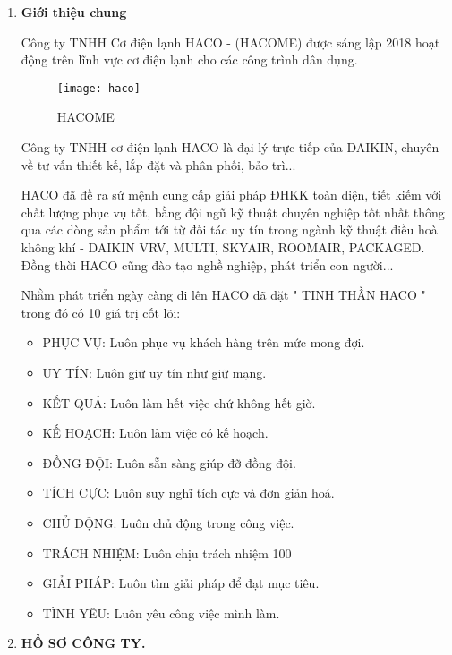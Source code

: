 \documentclass[12pt,a4paper]{article}
\begin{document}
\begin{enumerate}
   \item \textbf{Giới thiệu chung}
   
\hspace{1cm} Công ty TNHH Cơ điện lạnh HACO - (HACOME) được sáng lập 2018 hoạt động trên lĩnh vực cơ điện lạnh cho các công trình dân dụng.\\

\begin{figure}[htpb]
\centering
\texttt{[image: haco]}
\caption{HACOME}
\end{figure}

\hspace{1cm} Công ty TNHH cơ điện lạnh HACO là đại lý trực tiếp của DAIKIN, chuyên về tư vấn thiết kế, lắp đặt và phân phối, bảo trì...

\hspace{1cm} HACO đã đề ra sứ mệnh cung cấp giải pháp ĐHKK toàn diện, tiết kiếm với chất lượng phục vụ tốt, bằng đội ngũ kỹ thuật chuyên nghiệp tốt nhất thông qua các dòng sản phẩm tới từ đối tác uy tín trong ngành kỹ thuật điều hoà không khí - DAIKIN VRV, MULTI, SKYAIR, ROOMAIR, PACKAGED. Đồng thời HACO cũng đào tạo nghề nghiệp, phát triển con người...

\hspace{1cm} Nhằm phát triển ngày càng đi lên HACO đã đặt " TINH THẦN HACO " trong đó có 10 giá trị cốt lõi:
\begin{itemize}
 \item PHỤC VỤ: Luôn phục vụ khách hàng trên mức mong đợi.
 \item UY TÍN: Luôn giữ uy tín như giữ mạng.
 \item KẾT QUẢ: Luôn làm hết việc chứ không hết giờ.
 \item KẾ HOẠCH: Luôn làm việc có kế hoạch.
 \item ĐỒNG ĐỘI: Luôn sẵn sàng giúp đỡ đồng đội.
 \item TÍCH CỰC: Luôn suy nghĩ tích cực và đơn giản hoá.
 \item CHỦ ĐỘNG: Luôn chủ động trong công việc.
 \item TRÁCH NHIỆM: Luôn chịu trách nhiệm 100%
 \item GIẢI PHÁP: Luôn tìm giải pháp để đạt mục tiêu.
 \item TÌNH YÊU: Luôn yêu công việc mình làm.
\end{itemize}

\newpage
\item \textbf{HỒ SƠ CÔNG TY.}


\end{enumerate}
\end{document}
